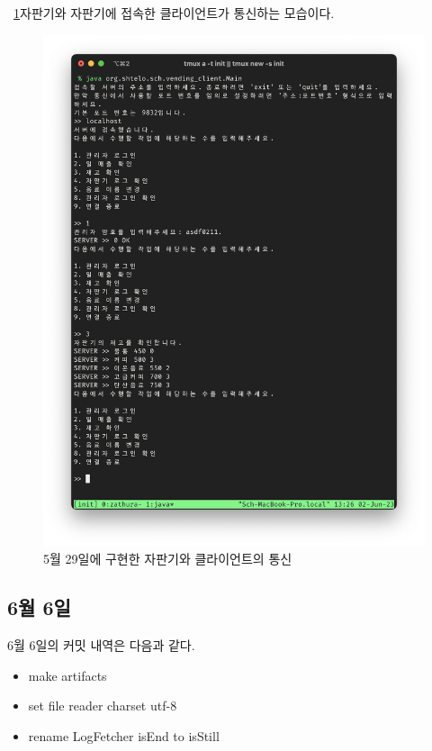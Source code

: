 \documentclass{oblivoir}
\newcommand{\figref}[1]{\figurename~\ref{#1}}
\begin{document}
    \figref{fig:0529-client}\는 자판기와 자판기에 접속한 클라이언트가 통신하는 모습이다.
    \begin{figure}
        \centering
        \includegraphics[width=\textwidth]{images/dev-snapshop/0529-client}
        \caption{5월 29일에 구현한 자판기와 클라이언트의 통신}
        \label{fig:0529-client}
    \end{figure}

    \subsection{6월 6일}

    6월 6일의 커밋 내역은 다음과 같다.

    \begin{itemize}
        \item make artifacts
        \item set file reader charset utf-8
        \item rename LogFetcher isEnd to isStill
    \end{itemize}
\end{document}
